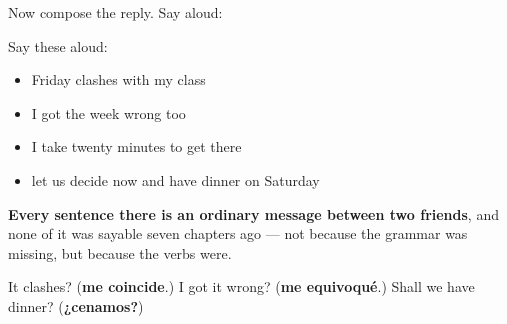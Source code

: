 \begin{grammarlens}[title={What you've built}]
Now compose the reply. Say aloud:

Say these aloud:

\begin{itemize}
\raggedright
  \item Friday clashes with my class
  \item I got the week wrong too
  \item I take twenty minutes to get there
  \item let us decide now and have dinner on Saturday
\end{itemize}

\textbf{Every sentence there is an ordinary message between two friends}, and none of it was sayable seven chapters ago — not because the grammar was missing, but because the verbs were.
\end{grammarlens}

\begin{tcolorbox}[breakable,colback=teal!4,colframe=teal!35!black,title={Before you move on}]
It clashes? (\textbf{me coincide}.) I got it wrong? (\textbf{me equivoqué}.) Shall we have dinner? (\textbf{¿cenamos?})
\end{tcolorbox}
